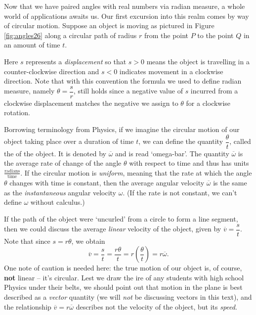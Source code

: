 Now that we have paired angles with real numbers via radian measure, a whole world of applications awaits us.  Our first excursion into this realm comes by way of circular motion.  Suppose an object is moving as pictured in Figure \ref{fig:angles26} along a circular path of radius $r$ from the point $P$ to the point $Q$ in an amount of time $t$.  


Here $s$ represents a \textit{displacement} so that  $s > 0$ means the object is travelling in a counter-clockwise direction and $s<0$ indicates movement in a clockwise direction. Note that with this convention the formula we used to define radian measure, namely $\theta = \dfrac{s}{r}$, still holds since a negative value of $s$ incurred from a clockwise displacement matches the negative we assign to $\theta$ for a clockwise rotation. 

Borrowing terminology from Physics, if we imagine the circular motion of our object taking place over a duration of time $t$, we can define the quantity $\dfrac{\theta}{t}$, called the  of the object.  It is denoted by $\overline{\omega}$ and is read `omega-bar'.  The quantity $\overline{\omega}$ is the average rate of change of the angle $\theta$ with respect to time and thus has units $\frac{\text{radians}}{\text{time}}$. If the circular motion is \textit{uniform}, meaning that the rate at which the angle $\theta$ changes with time is constant, then the average angular velocity $\overline{\omega}$ is the same as the \textit{instantaneous} angular velocity $\omega$. (If the rate is not constant, we can't define $\omega$ without calculus.)  

\smallskip

If the path of the object were `uncurled' from a circle to form a line segment, then we could discuss the average \textit{linear} velocity of the object, given by $\overline{v} = \dfrac{s}{t}$. Note that since $s = r\theta$, we obtain
\[
\overline{v} = \frac{s}{t} = \frac{r\theta}{t} = r\left(\frac{\theta}{t}\right) = r\overline{\omega}.
\]
One note of caution is needed here: the true motion of our object is, of course, \textbf{not} linear -- it's circular. Lest we draw the ire of any students with high school Physics under their belts, we should point out that motion in the plane is best described as a \textit{vector} quantity (we will \textit{not} be discussing vectors in this text), and the relationship $\overline{v} = r\overline{\omega}$ describes not the velocity of the object, but its \textit{speed}. 

